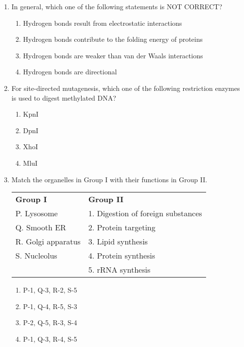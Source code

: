 \documentclass[12pt]{article}
\begin{document}
\begin{enumerate}[label=Q.\arabic*,start=26]
	\item In general, which one of the following statements is NOT CORRECT?
		\begin{enumerate}[label=(\Alph*)]
			\item Hydrogen bonds result from electrostatic interactions
			\item Hydrogen bonds contribute to the folding energy of proteins
			\item Hydrogen bonds are weaker than van der Waals interactions
			\item Hydrogen bonds are directional
		\end{enumerate}

	\item For site-directed mutagenesis, which one of the following restriction enzymes is used to digest methylated DNA?
		\begin{enumerate}[label=(\Alph*)]
			\item KpnI
			\item DpnI
			\item XhoI
			\item MluI
		\end{enumerate}

	\item Match the organelles in Group I with their functions in Group II.

		\begin{center}
			\begin{tabular}{ll}
				\textbf{Group I} & \textbf{Group II} \\
				P. Lysosome & 1. Digestion of foreign substances \\
				Q. Smooth ER & 2. Protein targeting \\
				R. Golgi apparatus & 3. Lipid synthesis \\
				S. Nucleolus & 4. Protein synthesis \\
				& 5. rRNA synthesis \\
			\end{tabular}
		\end{center}

		\begin{enumerate}[label=(\Alph*)]
			\item P-1, Q-3, R-2, S-5
			\item P-1, Q-4, R-5, S-3
			\item P-2, Q-5, R-3, S-4
			\item P-1, Q-3, R-4, S-5
		\end{enumerate}


\end{enumerate}
\end{document}
